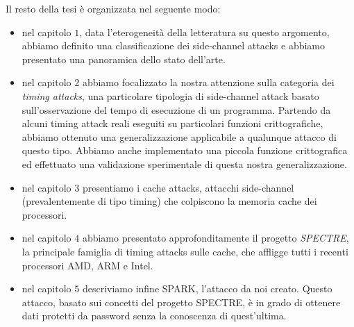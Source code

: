 	 Il resto della tesi è organizzata nel seguente modo:
	 \begin{itemize}
	 	\item nel capitolo $1$, data l'eterogeneità della letteratura su questo argomento, abbiamo definito una classificazione dei side-channel attacks e abbiamo presentato una panoramica dello stato dell'arte.
	 	\item nel capitolo $2$ abbiamo focalizzato la nostra attenzione sulla categoria dei \emph{timing attacks}, una particolare tipologia di side-channel attack basato sull'osservazione del tempo di esecuzione di un programma. Partendo da alcuni timing attack reali eseguiti su particolari funzioni crittografiche, abbiamo ottenuto una generalizzazione applicabile a qualunque attacco di questo tipo. Abbiamo anche implementato una piccola funzione crittografica ed effettuato una validazione sperimentale di questa nostra generalizzazione.
	 	\item nel capitolo $3$ presentiamo i cache attacks, attacchi side-channel (prevalentemente di tipo timing) che colpiscono la memoria cache dei processori.
	 	\item nel capitolo $4$ abbiamo presentato approfonditamente il progetto \emph{SPECTRE}, la principale famiglia di timing attacks sulle cache, che affligge tutti i recenti processori AMD, ARM e Intel.
	 	\item nel capitolo $5$ descriviamo infine \ac{SPARK}, l'attacco da noi creato. Questo attacco, basato sui concetti del progetto SPECTRE, è in grado di ottenere dati protetti da password senza la conoscenza di quest'ultima.
	 \end{itemize}    
